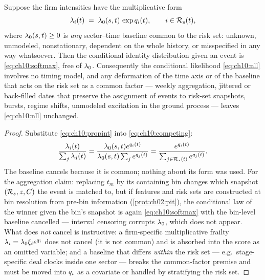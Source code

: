 \begin{proposition}\label{prop:ch10:cancel}
Suppose the firm intensities have the multiplicative form
\begin{equation}\label{eq:ch10:propint}
\lambda_i(t) \;=\; \lambda_0(s, t)\, \exp q_i(t),
\qquad i \in \mathcal{R}_s(t),
\end{equation}
where $\lambda_0(s,t) \ge 0$ is \emph{any} sector--time baseline common to
the risk set: unknown, unmodeled, nonstationary, dependent on the whole
history, or misspecified in any way whatsoever. Then the conditional
identity distribution given an event is \cref{eq:ch10:softmax}, free of
$\lambda_0$. Consequently the conditional likelihood \cref{eq:ch10:nll}
involves no timing model, and any deformation of the time axis or of the
baseline that acts on the risk set as a common factor --- weekly
aggregation, jittered or back-filled dates that preserve the assignment
of events to risk-set snapshots, bursts, regime shifts, unmodeled
excitation in the ground process --- leaves \cref{eq:ch10:nll} unchanged.
\end{proposition}

\begin{proof}
Substitute \cref{eq:ch10:propint} into \cref{eq:ch10:competing}:
\[
\frac{\lambda_i(t)}{\sum_{j} \lambda_j(t)}
 =
\frac{\lambda_0(s,t) e^{q_i(t)}}{\lambda_0(s,t) \sum_{j} e^{q_j(t)}}
 =
\frac{e^{q_i(t)}}{\sum_{j \in \mathcal{R}_s(t)} e^{q_j(t)}} .
\]
The baseline cancels because it is common; nothing about its form was
used. For the aggregation claim: replacing $t_m$ by its containing bin
changes which snapshot $(\mathcal{R}_s, z, C)$ the event is matched to,
but if features and risk sets are constructed at bin resolution from
pre-bin information (\cref{prot:ch02:pit}), the conditional law of the
winner given the bin's snapshot is again \cref{eq:ch10:softmax} with the
bin-level baseline cancelled --- interval censoring corrupts $\lambda_0$,
which does not appear. What does \emph{not} cancel is instructive: a
firm-specific multiplicative frailty $\lambda_i = \lambda_0 \xi_i e^{q_i}$
does not cancel (it is not common) and is absorbed into the score as an
omitted variable; and a baseline that differs \emph{within} the risk set
--- e.g.\ stage-specific deal clocks inside one sector --- breaks the
common-factor premise and must be moved into $q_i$ as a covariate or
handled by stratifying the risk set.
\end{proof}

